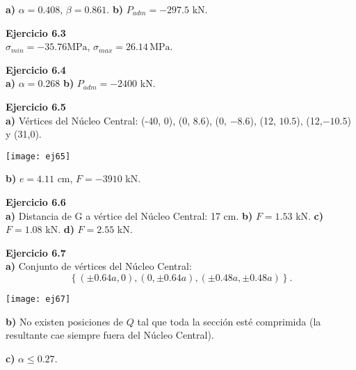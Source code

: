\textbf{a)} $\alpha = 0.408$, $\beta = 0.861$. 
\textbf{b)} $P_{adm} = -297.5 $ kN.\newline

\textbf{Ejercicio 6.3}\\

$\sigma_{min} = -35.76 \text{MPa}$, $\sigma_{max} = 26.14 \, \text{MPa}$.\newline

\textbf{Ejercicio 6.4}\\

\textbf{a)} $\alpha = 0.268$
\textbf{b)} $P_{adm} = -2400 $ kN.\newline


\textbf{Ejercicio 6.5}\\

\textbf{a)} Vértices del Núcleo Central: (-40, 0), (0, $8.6$), (0, $-8.6$), (12, $10.5$), (12,$-10.5$) y (31,0).

\begin{center}
\texttt{[image: ej65]}
\end{center}

\textbf{b)} $e=4.11$ cm, $F=-3910$ kN.\newline

\textbf{Ejercicio 6.6}\\

\textbf{a)} Distancia de G a vértice del Núcleo Central: 17 cm. \textbf{b)} $F=1.53$ kN.
\textbf{c)}
$F=1.08$ kN.
\textbf{d)}
$F=2.55$ kN.\newline

\textbf{Ejercicio 6.7}\\

\textbf{a)} Conjunto de vértices del Núcleo Central: $$
\left\{(\pm 0.64a,0), (0, \pm 0.64a), (\pm 0.48a,\pm 0.48a)\right\}.
$$

\begin{center}
	\texttt{[image: ej67]}
\end{center}

\textbf{b)}
No existen posiciones de $Q$ tal que toda la sección esté comprimida (la resultante cae siempre fuera del Núcleo Central).

\textbf{c)}
$\alpha \leq 0.27$.\newline

